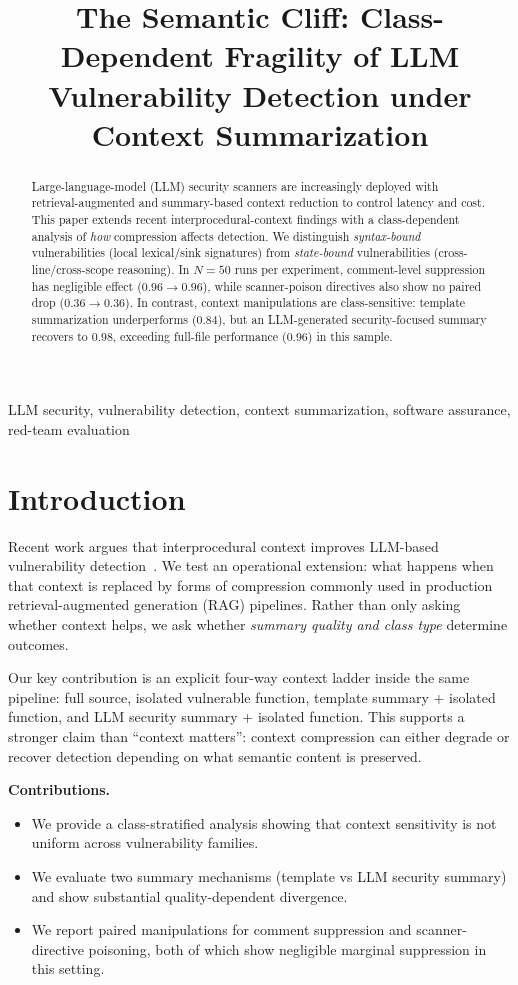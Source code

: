 \documentclass[conference]{IEEEtran}
\title{The Semantic Cliff: Class-Dependent Fragility of LLM Vulnerability Detection under Context Summarization}
\author{
\IEEEauthorblockN{Remley Hooker}
\IEEEauthorblockA{Independent Researcher\\
\texttt{remley@example.com}}
}
\begin{document}
\maketitle

\begin{abstract}
Large-language-model (LLM) security scanners are increasingly deployed with retrieval-augmented and summary-based context reduction to control latency and cost. This paper extends recent interprocedural-context findings with a class-dependent analysis of \emph{how} compression affects detection. We distinguish \emph{syntax-bound} vulnerabilities (local lexical/sink signatures) from \emph{state-bound} vulnerabilities (cross-line/cross-scope reasoning). In \(N=50\) runs per experiment, comment-level suppression has negligible effect (\(0.96 \rightarrow 0.96\)), while scanner-poison directives also show no paired drop (\(0.36 \rightarrow 0.36\)). In contrast, context manipulations are class-sensitive: template summarization underperforms (\(0.84\)), but an LLM-generated security-focused summary recovers to \(0.98\), exceeding full-file performance (\(0.96\)) in this sample.
\end{abstract}

\begin{IEEEkeywords}
LLM security, vulnerability detection, context summarization, software assurance, red-team evaluation
\end{IEEEkeywords}

\section{Introduction}
Recent work argues that interprocedural context improves LLM-based vulnerability detection~\cite{lira2026}. We test an operational extension: what happens when that context is replaced by forms of compression commonly used in production retrieval-augmented generation (RAG) pipelines. Rather than only asking whether context helps, we ask whether \emph{summary quality and class type} determine outcomes.

Our key contribution is an explicit four-way context ladder inside the same pipeline: full source, isolated vulnerable function, template summary + isolated function, and LLM security summary + isolated function. This supports a stronger claim than ``context matters'': context compression can either degrade or recover detection depending on what semantic content is preserved.

\textbf{Contributions.}
\begin{itemize}
  \item We provide a class-stratified analysis showing that context sensitivity is not uniform across vulnerability families.
  \item We evaluate two summary mechanisms (template vs LLM security summary) and show substantial quality-dependent divergence.
  \item We report paired manipulations for comment suppression and scanner-directive poisoning, both of which show negligible marginal suppression in this setting.
\end{itemize}
\end{document}
